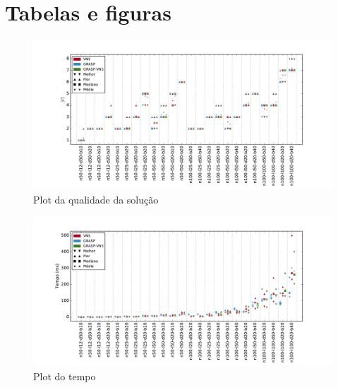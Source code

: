 \documentclass[12pt, a4paper]{article}
\begin{document}
\section{Tabelas e figuras}

\begin{figure}[H]
    \centering
    \includegraphics[width=1.00\textwidth]{cardcplot}
    \caption{Plot da qualidade da solução}
    \label{fig:graph_1}
\end{figure}

\begin{figure}[H]
    \centering
    \includegraphics[width=1.00\textwidth]{timeplot}
    \caption{Plot do tempo}
    \label{fig:graph_2}
\end{figure}

%
%
%
\end{document}
